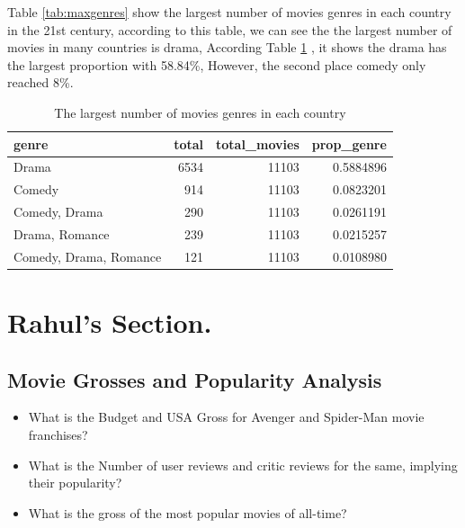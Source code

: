 \documentclass[11pt,a4paper,]{article}
\begin{document}
Table \ref{tab:maxgenres} show the largest number of movies genres in each country in the 21st century, according to this table, we can see the the largest number of movies in many countries is drama, According Table \ref{tab:pretdrame} , it shows the drama has the largest proportion with 58.84\%, However, the second place comedy only reached 8\%.

\begin{table}

\caption{\label{tab:pretdrame} The largest number of movies genres in each country}
\centering
\begin{tabular}[t]{lrrr}
\toprule
genre & total & total\_movies & prop\_genre\\
\midrule
Drama & 6534 & 11103 & 0.5884896\\
Comedy & 914 & 11103 & 0.0823201\\
Comedy, Drama & 290 & 11103 & 0.0261191\\
Drama, Romance & 239 & 11103 & 0.0215257\\
Comedy, Drama, Romance & 121 & 11103 & 0.0108980\\
\bottomrule
\end{tabular}
\end{table}

\newpage

\hypertarget{rahuls-section.}{%
\section{Rahul's Section.}\label{rahuls-section.}}

\hypertarget{movie-grosses-and-popularity-analysis}{%
\subsection{Movie Grosses and Popularity Analysis}\label{movie-grosses-and-popularity-analysis}}

\begin{itemize}
\item
  What is the Budget and USA Gross for Avenger and Spider-Man movie franchises?
\item
  What is the Number of user reviews and critic reviews for the same, implying their popularity?
\item
  What is the gross of the most popular movies of all-time?
\end{itemize}
\end{document}

